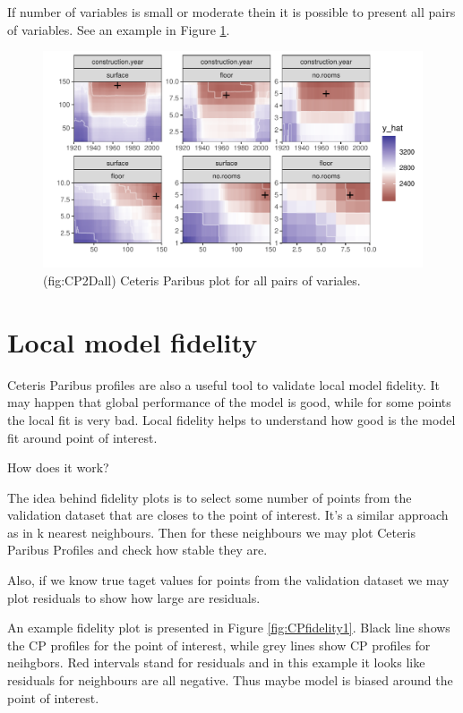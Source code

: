 \documentclass[]{book}
\theoremstyle{definition}
\theoremstyle{definition}
\theoremstyle{definition}
\theoremstyle{remark}
\begin{document}
If number of variables is small or moderate thein it is possible to
present all pairs of variables. See an example in Figure
\ref{fig:CP2Dall}.

\begin{figure}

{\centering \includegraphics[width=0.9\linewidth]{figure/cp_2d_all} 

}

\caption{(fig:CP2Dall) Ceteris Paribus plot for all pairs of variales.}\label{fig:CP2Dall}
\end{figure}

\hypertarget{local-model-fidelity}{%
\section{Local model fidelity}\label{local-model-fidelity}}

Ceteris Paribus profiles are also a useful tool to validate local model
fidelity. It may happen that global performance of the model is good,
while for some points the local fit is very bad. Local fidelity helps to
understand how good is the model fit around point of interest.

How does it work?

The idea behind fidelity plots is to select some number of points from
the validation dataset that are closes to the point of interest. It's a
similar approach as in k nearest neighbours. Then for these neighbours
we may plot Ceteris Paribus Profiles and check how stable they are.

Also, if we know true taget values for points from the validation
dataset we may plot residuals to show how large are residuals.

An example fidelity plot is presented in Figure \ref{fig:CPfidelity1}.
Black line shows the CP profiles for the point of interest, while grey
lines show CP profiles for neihgbors. Red intervals stand for residuals
and in this example it looks like residuals for neighbours are all
negative. Thus maybe model is biased around the point of interest.
\end{document}
